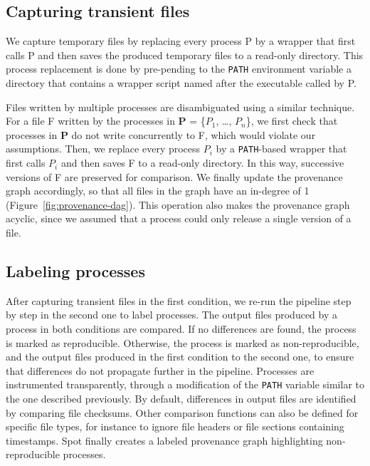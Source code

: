 \documentclass[a4paper,num-refs]{oup-contemporary}
\newcommand{\toolname}[0]{Spot\xspace}
\begin{document}
\subsection{Capturing transient files}

We capture temporary files by replacing every
process P by a wrapper that first calls P and then saves the produced
temporary files to a read-only directory. This process replacement is done by pre-pending
 to the \texttt{PATH} environment
variable a directory that contains a wrapper script named after the executable
called by P.

Files written by multiple processes are disambiguated using a similar technique. For a
 file F written by the processes in \textbf{P} = \{$P_{1}$, \ldots,
 $P_{n}$\}, we first check that processes in \textbf{P} do not
 write concurrently to F, which would violate our assumptions. Then, we
 replace every process $P_{i}$ by a \texttt{PATH}-based wrapper that first
 calls $P_{i}$ and then saves F to a read-only directory. In this way,
 successive versions of F are preserved for comparison. We finally
 update the provenance graph accordingly, so that all files in the graph
 have an in-degree of 1 (Figure~\ref{fig:provenance-dag}). This operation also makes the provenance graph
 acyclic, since we assumed that a process could only release a single version of a file.



\subsection{Labeling processes} 

After capturing transient files in the first condition, we re-run the pipeline
step by step in the second one to label processes. The output files
produced by a process in both conditions are compared.
 If no differences are found, the process is marked as
reproducible. Otherwise, the process is marked as non-reproducible, and the
output files produced in the first condition to the second one, to ensure
that differences do not propagate further in the pipeline. Processes are
instrumented transparently, through a modification of the \texttt{PATH}
variable similar to the one described previously. By default, differences
in output files are identified by comparing file checksums. Other
comparison functions can also be defined for specific file types, for
instance to ignore file headers or file sections containing timestamps.
\toolname finally creates a labeled
provenance graph highlighting non-reproducible processes.
\end{document}
